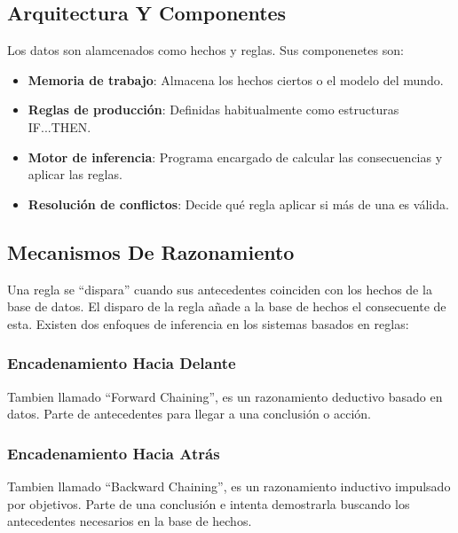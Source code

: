 \subsection{Arquitectura Y Componentes}
Los datos son alamcenados como hechos y reglas. Sus componenetes son:
\begin{itemize}
    \item \textbf{Memoria de trabajo}: Almacena los hechos ciertos o el modelo del mundo.
    \item \textbf{Reglas de producción}: Definidas habitualmente como estructuras IF...THEN.
    \item \textbf{Motor de inferencia}: Programa encargado de calcular las consecuencias y aplicar las reglas.
    \item \textbf{Resolución de conflictos}: Decide qué regla aplicar si más de una es válida.
\end{itemize}

\subsection{Mecanismos De Razonamiento}
Una regla se ``dispara'' cuando sus antecedentes coinciden con los hechos de la base de datos.  El
disparo de la regla añade a la base de hechos el consecuente de esta. 
\medskip
Existen dos enfoques de inferencia en los sistemas basados en reglas:

\subsubsection{Encadenamiento Hacia Delante}
Tambien llamado ``Forward Chaining'', es un razonamiento deductivo basado en datos. Parte de antecedentes para llegar a una conclusión o acción.

\subsubsection{Encadenamiento Hacia Atrás}
Tambien llamado ``Backward Chaining'', es un razonamiento inductivo impulsado por objetivos. Parte de una conclusión e intenta demostrarla buscando los antecedentes necesarios en la base de hechos.

